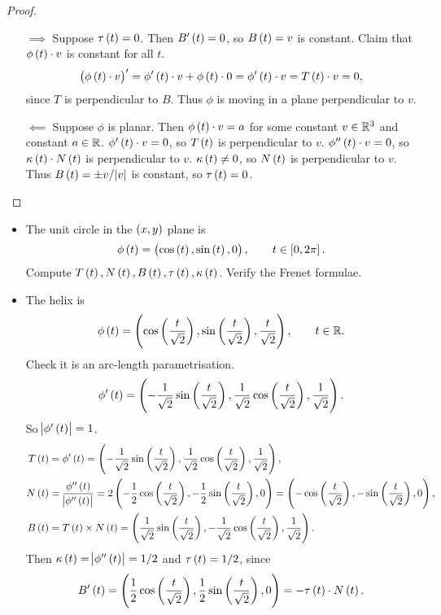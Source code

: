 \begin{proof}
\hfill
\begin{itemize}
\item[$ \implies $] Suppose $ \tau\br{t} = 0 $. Then $ B'\br{t} = 0 $, so $ B\br{t} = v $ is constant. Claim that $ \phi\br{t} \cdot v $ is constant for all $ t $.
$$ \br{\phi\br{t} \cdot v}' = \phi'\br{t} \cdot v + \phi\br{t} \cdot 0 = \phi'\br{t} \cdot v = T\br{t} \cdot v = 0, $$
since $ T $ is perpendicular to $ B $. Thus $ \phi $ is moving in a plane perpendicular to $ v $.
\item[$ \impliedby $] Suppose $ \phi $ is planar. Then $ \phi\br{t} \cdot v = a $ for some constant $ v \in \mathbb{R}^3 $ and constant $ a \in \mathbb{R} $. $ \phi'\br{t} \cdot v = 0 $, so $ T\br{t} $ is perpendicular to $ v $. $ \phi''\br{t} \cdot v = 0 $, so $ \kappa\br{t} \cdot N\br{t} $ is perpendicular to $ v $. $ \kappa\br{t} \ne 0 $, so $ N\br{t} $ is perpendicular to $ v $. Thus $ B\br{t} = \pm v / \abs{v} $ is constant, so $ \tau\br{t} = 0 $.
\end{itemize}
\end{proof}

\begin{example*}
\hfill
\begin{itemize}
\item The unit circle in the $ \br{x, y} $ plane is
$$ \phi\br{t} = \br{\cos\br{t}, \sin\br{t}, 0}, \qquad t \in \sbr{0, 2\pi}. $$
Compute $ T\br{t}, N\br{t}, B\br{t}, \tau\br{t}, \kappa\br{t} $. Verify the Frenet formulae.

\pagebreak

\item The helix is
$$ \phi\br{t} = \br{\cos\br{\dfrac{t}{\sqrt{2}}}, \sin\br{\dfrac{t}{\sqrt{2}}}, \dfrac{t}{\sqrt{2}}}, \qquad t \in \R. $$
Check it is an arc-length parametrisation.
$$ \phi'\br{t} = \br{-\dfrac{1}{\sqrt{2}}\sin\br{\dfrac{t}{\sqrt{2}}}, \dfrac{1}{\sqrt{2}}\cos\br{\dfrac{t}{\sqrt{2}}}, \dfrac{1}{\sqrt{2}}}. $$
So $ \abs{\phi'\br{t}} = 1 $.
\begin{align*}
T\br{t} & = \phi'\br{t} = \br{-\dfrac{1}{\sqrt{2}}\sin\br{\dfrac{t}{\sqrt{2}}}, \dfrac{1}{\sqrt{2}}\cos\br{\dfrac{t}{\sqrt{2}}}, \dfrac{1}{\sqrt{2}}}, \\
N\br{t} & = \dfrac{\phi''\br{t}}{\abs{\phi''\br{t}}} = 2\br{-\dfrac{1}{2}\cos\br{\dfrac{t}{\sqrt{2}}}, -\dfrac{1}{2}\sin\br{\dfrac{t}{\sqrt{2}}}, 0} = \br{-\cos\br{\dfrac{t}{\sqrt{2}}}, -\sin\br{\dfrac{t}{\sqrt{2}}}, 0}, \\
B\br{t} & = T\br{t} \times N\br{t} = \br{\dfrac{1}{\sqrt{2}}\sin\br{\dfrac{t}{\sqrt{2}}}, -\dfrac{1}{\sqrt{2}}\cos\br{\dfrac{t}{\sqrt{2}}}, \dfrac{1}{\sqrt{2}}}.
\end{align*}
Then $ \kappa\br{t} = \abs{\phi''\br{t}} = 1 / 2 $ and $ \tau\br{t} = 1 / 2 $, since
$$ B'\br{t} = \br{\dfrac{1}{2}\cos\br{\dfrac{t}{\sqrt{2}}}, \dfrac{1}{2}\sin\br{\dfrac{t}{\sqrt{2}}}, 0} = -\tau\br{t} \cdot N\br{t}. $$
\end{itemize}
\end{example*}

